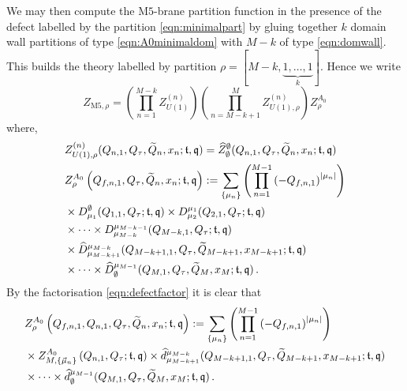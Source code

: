 \documentclass[main.tex]{subfiles}
\begin{document}
We may then compute the M$5$-brane partition function in the presence of the defect labelled by the partition \eqref{eqn:minimalpart} by gluing together $k$ domain wall partitions of type \eqref{eqn:A0minimaldom} with $M-k$ of type \eqref{eqn:domwall}. This builds the theory labelled by partition $\rho=[M-k,\underbrace{1,\dots,1}_{k}]$. Hence we write
\begin{equation}
Z_{\text{M$5$},\rho}=\left(\prod_{n=1}^{M-k}Z_{U(1)}^{(n)}\right)\left(\prod_{n=M-k+1}^MZ_{U(1),\rho}^{(n)}\right)Z_{\rho}^{A_0}
\end{equation}
where, 
\begin{align}
&Z_{U(1),\rho}^{(n)}(Q_{n,1},Q_{\tau},\widetilde{Q}_n,x_n;\mathfrak{t},\mathfrak{q})=\widehat{Z}^{\emptyset}_{\emptyset}(Q_{n,1},Q_{\tau},\widetilde{Q}_n,x_n;\mathfrak{t},\mathfrak{q})\\
&\begin{aligned}
&Z_{\rho}^{A_0}\left(Q_{f,n,1},Q_{\tau},\widetilde{Q}_n,x_n;\mathfrak{t},\mathfrak{q}\right):=\sum_{\{\mu_{n}\}}\left(\prod_{n=1}^{M-1}\left(-Q_{f,n,1}\right)^{|\mu_{n}|}\right)\\
&\times D^{\emptyset}_{\mu_1}(Q_{1,1},Q_{\tau};\mathfrak{t},\mathfrak{q})\times D^{\mu_1}_{\mu_2}(Q_{2,1},Q_{\tau};\mathfrak{t},\mathfrak{q})\\
&\times\dots \times D^{\mu_{M-k-1}}_{\mu_{M-k}}(Q_{M-k,1},Q_{\tau};\mathfrak{t},\mathfrak{q})\\
&\times \widehat{D}^{\mu_{M-k}}_{\mu_{M-k+1}}(Q_{M-k+1,1},Q_{\tau},\widetilde{Q}_{M-k+1},x_{M-k+1};\mathfrak{t},\mathfrak{q})\\
&\times\dots\times\widehat{D}^{\mu_{M-1}}_{\emptyset}(Q_{M,1},Q_{\tau},\widetilde{Q}_{M},x_{M};\mathfrak{t},\mathfrak{q})\,.
\end{aligned}
\end{align}
By the factorisation \eqref{eqn:defectfactor} it is clear that
\begin{equation}
\begin{aligned}
&Z_{\rho}^{A_0}\left(Q_{f,n,1},Q_{n,1},Q_{\tau},\widetilde{Q}_n,x_n;\mathfrak{t},\mathfrak{q}\right):=\sum_{\{\mu_{n}\}}\left(\prod_{n=1}^{M-1}\left(-Q_{f,n,1}\right)^{|\mu_{n}|}\right)\\
&\times Z_{M,\{\vec{\mu}_n\}}^{A_0}\left(Q_{n,1},Q_{\tau};\mathfrak{t},\mathfrak{q}\right)\times \widehat{d}^{\mu_{M-k}}_{\mu_{M-k+1}}(Q_{M-k+1,1},Q_{\tau},\widetilde{Q}_{M-k+1},x_{M-k+1};\mathfrak{t},\mathfrak{q})\\
&\times\dots\times\widehat{d}^{\mu_{M-1}}_{\emptyset}(Q_{M,1},Q_{\tau},\widetilde{Q}_{M},x_{M};\mathfrak{t},\mathfrak{q})\,.
\end{aligned}
\end{equation}
\end{document}
